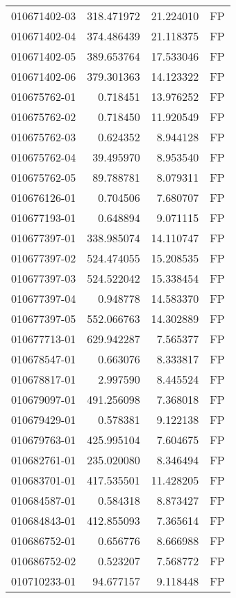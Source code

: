 \begin{tabular}{lrrl}
010671402-03 &  318.471972 &    21.224010 &   FP \\
010671402-04 &  374.486439 &    21.118375 &   FP \\
010671402-05 &  389.653764 &    17.533046 &   FP \\
010671402-06 &  379.301363 &    14.123322 &   FP \\
010675762-01 &    0.718451 &    13.976252 &   FP \\
010675762-02 &    0.718450 &    11.920549 &   FP \\
010675762-03 &    0.624352 &     8.944128 &   FP \\
010675762-04 &   39.495970 &     8.953540 &   FP \\
010675762-05 &   89.788781 &     8.079311 &   FP \\
010676126-01 &    0.704506 &     7.680707 &   FP \\
010677193-01 &    0.648894 &     9.071115 &   FP \\
010677397-01 &  338.985074 &    14.110747 &   FP \\
010677397-02 &  524.474055 &    15.208535 &   FP \\
010677397-03 &  524.522042 &    15.338454 &   FP \\
010677397-04 &    0.948778 &    14.583370 &   FP \\
010677397-05 &  552.066763 &    14.302889 &   FP \\
010677713-01 &  629.942287 &     7.565377 &   FP \\
010678547-01 &    0.663076 &     8.333817 &   FP \\
010678817-01 &    2.997590 &     8.445524 &   FP \\
010679097-01 &  491.256098 &     7.368018 &   FP \\
010679429-01 &    0.578381 &     9.122138 &   FP \\
010679763-01 &  425.995104 &     7.604675 &   FP \\
010682761-01 &  235.020080 &     8.346494 &   FP \\
010683701-01 &  417.535501 &    11.428205 &   FP \\
010684587-01 &    0.584318 &     8.873427 &   FP \\
010684843-01 &  412.855093 &     7.365614 &   FP \\
010686752-01 &    0.656776 &     8.666988 &   FP \\
010686752-02 &    0.523207 &     7.568772 &   FP \\
010710233-01 &   94.677157 &     9.118448 &   FP \\

\end{tabular}

